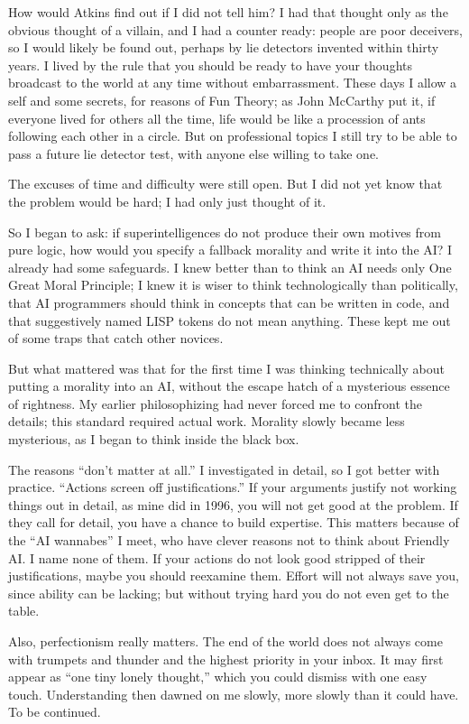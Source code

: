 How would Atkins find out if I did not tell him? I had that thought only as the obvious thought of a villain, and I had a counter ready: people are poor deceivers, so I would likely be found out, perhaps by lie detectors invented within thirty years. I lived by the rule that you should be ready to have your thoughts broadcast to the world at any time without embarrassment. These days I allow a self and some secrets, for reasons of Fun Theory; as John McCarthy put it, if everyone lived for others all the time, life would be like a procession of ants following each other in a circle. But on professional topics I still try to be able to pass a future lie detector test, with anyone else willing to take one.

The excuses of time and difficulty were still open. But I did not yet know that the problem would be hard; I had only just thought of it.

So I began to ask: if superintelligences do not produce their own motives from pure logic, how would you specify a fallback morality and write it into the AI?  I already had some safeguards. I knew better than to think an AI needs only One Great Moral Principle; I knew it is wiser to think technologically than politically, that AI programmers should think in concepts that can be written in code, and that suggestively named LISP tokens do not mean anything. These kept me out of some traps that catch other novices.

But what mattered was that for the first time I was thinking technically about putting a morality into an AI, without the escape hatch of a mysterious essence of rightness. My earlier philosophizing had never forced me to confront the details; this standard required actual work. Morality slowly became less mysterious, as I began to think inside the black box.

The reasons ``don't matter at all.'' I investigated in detail, so I got better with practice. ``Actions screen off justifications.'' If your arguments justify not working things out in detail, as mine did in 1996, you will not get good at the problem. If they call for detail, you have a chance to build expertise.  This matters because of the ``AI wannabes'' I meet, who have clever reasons not to think about Friendly AI. I name none of them. If your actions do not look good stripped of their justifications, maybe you should reexamine them. Effort will not always save you, since ability can be lacking; but without trying hard you do not even get to the table.

Also, perfectionism really matters. The end of the world does not always come with trumpets and thunder and the highest priority in your inbox. It may first appear as ``one tiny lonely thought,'' which you could dismiss with one easy touch. Understanding then dawned on me slowly, more slowly than it could have. To be continued.
